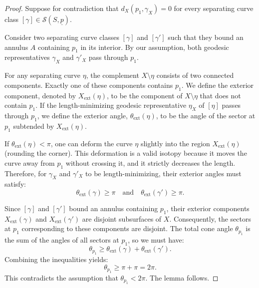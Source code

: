 \documentclass[11pt, letterpaper]{amsart}
\theoremstyle{definition}
\theoremstyle{remark}
\newcommand{\up}{\underline{p}}
\newcommand{\Sp}{(S,\up)}
\newcommand{\cS}{\mathcal{S}}
\newcommand{\DEF}{} \newcommand{\WARN}{\textcolor{red}} \newcommand{\ALT}{\textcolor{brown}} \newcommand{\TODO}{\textcolor{teal}} %
\numberwithin{equation}{section}
\begin{document}
\begin{proof}
Suppose for contradiction that \(d_X(p_1,\gamma_X)=0\) for every separating
curve class \([\gamma]\in\cS\Sp\).

Consider two separating curve classes \([\gamma]\) and \([\gamma']\) such that they
bound an annulus \(A\) containing \(p_1\) in its interior.
By our assumption, both geodesic representatives \(\gamma_X\) and \(\gamma'_X\)
pass through \(p_1\).

For any separating curve \(\eta\), the complement \(X \setminus \eta\) consists of two connected components. 
Exactly one of these components contains \(p_1\).
We define the \DEF{exterior component}, denoted by \(X_{\mathrm{ext}}(\eta)\), to be the component of \(X \setminus \eta\) that does not contain \(p_1\). 
If the length-minimizing geodesic representative \(\eta_X\) of \([\eta]\) passes through \(p_1\), we define the \DEF{exterior angle}, \(\theta_{\mathrm{ext}}(\eta)\),
to be the angle of the sector at \(p_1\) subtended by \(X_{\mathrm{ext}}(\eta)\). 

If \(\theta_{\mathrm{ext}}(\eta) < \pi\), one can deform the curve \(\eta\) slightly into the region \(X_{\mathrm{ext}}(\eta)\) (rounding the corner). 
This deformation is a valid isotopy because it moves the curve away from \(p_1\) without crossing it,
and it strictly decreases the length.
Therefore, for \(\gamma_X\) and \(\gamma'_X\) to be length-minimizing, their exterior angles must satisfy:
\[
\theta_{\mathrm{ext}}(\gamma) \ge \pi \quad \text{and} \quad \theta_{\mathrm{ext}}(\gamma') \ge \pi.
\]

Since \([\gamma]\) and \([\gamma']\) bound an annulus containing \(p_1\), their exterior components \(X_{\mathrm{ext}}(\gamma)\) and \(X_{\mathrm{ext}}(\gamma')\) are disjoint subsurfaces of \(X\). 
Consequently, the sectors at \(p_1\) corresponding to these components are disjoint. 
The total cone angle \(\theta_{p_1}\) is the sum of the angles of all sectors at \(p_1\), so we must have:
\[
\theta_{p_1} \ge \theta_{\mathrm{ext}}(\gamma) + \theta_{\mathrm{ext}}(\gamma').
\]
Combining the inequalities yields:
\[
\theta_{p_1} \ge \pi + \pi = 2\pi.
\]
This contradicts the assumption that \(\theta_{p_1} < 2\pi\).
The lemma follows. 
\end{proof}
\end{document}
